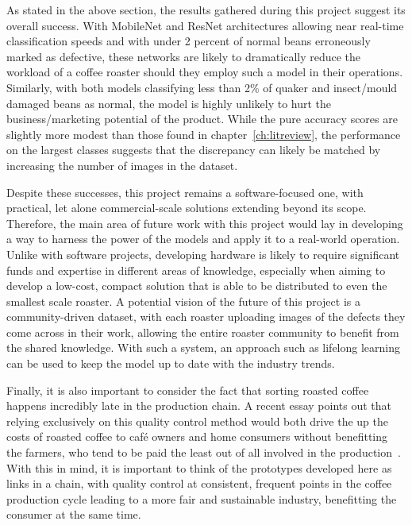 As stated in the above section, the results gathered during this project suggest its overall success.
With MobileNet and ResNet architectures allowing near real-time classification speeds and with under 2 percent of normal beans
erroneously marked as defective, these networks are likely to dramatically reduce the workload of a coffee roaster should they employ such
a model in their operations.
Similarly, with both models classifying less than 2\% of quaker and insect/mould damaged beans as normal,
the model is highly unlikely to hurt the business/marketing potential of the product.
While the pure accuracy scores are slightly more modest than those found in chapter~\ref{ch:litreview}, the performance on the largest
classes suggests that the discrepancy can likely be matched by increasing the number of images in the dataset.

Despite these successes, this project remains a software-focused one, with practical, let alone commercial-scale solutions
extending beyond its scope.
Therefore, the main area of future work with this project would lay in developing a way to harness the power of the models
and apply it to a real-world operation.
Unlike with software projects, developing hardware is likely to require significant funds and expertise in different areas of knowledge,
especially when aiming to develop a low-cost, compact solution that is able to be distributed to even the smallest scale roaster.
A potential vision of the future of this project is a community-driven dataset, with each roaster uploading images of the defects
they come across in their work, allowing the entire roaster community to benefit from the shared knowledge.
With such a system, an approach such as lifelong learning~\cite{Chen2017} can be used to keep the model up to date with the industry trends.

Finally, it is also important to consider the fact that sorting roasted coffee happens incredibly late in the production chain.
A recent essay points out that relying exclusively on
this quality control method would both drive the up the costs of roasted coffee to café owners and home consumers without benefitting the
farmers, who tend to be paid the least out of all involved in the production~\cite{ferranCoffeeEthics}.
With this in mind, it is important to think of the prototypes developed here as links in a chain, with quality control at
consistent, frequent points in the coffee production cycle leading to a more fair and sustainable industry, benefitting the
consumer at the same time.